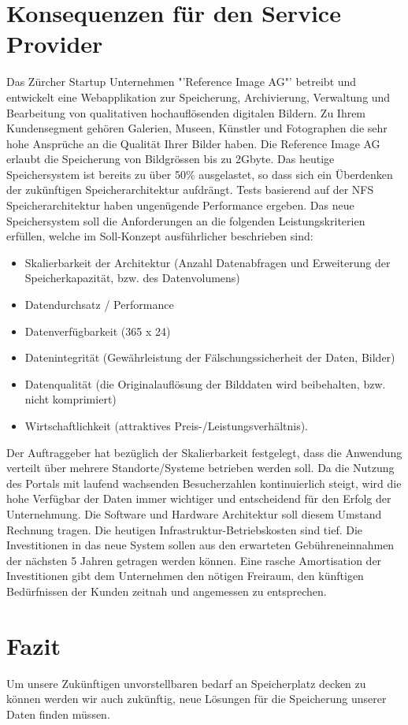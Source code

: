 \section{Konsequenzen für den Service Provider}
Das Zürcher Startup Unternehmen "'Reference Image AG"' betreibt und entwickelt eine Webapplikation zur Speicherung, Archivierung, Verwaltung und Bearbeitung von qualitativen hochauflösenden digitalen Bildern. Zu Ihrem Kundensegment gehören Galerien, Museen, Künstler und Fotographen die sehr hohe Ansprüche an die Qualität Ihrer Bilder haben. Die Reference Image AG erlaubt die Speicherung von Bildgrössen bis zu 2Gbyte. Das heutige Speichersystem ist bereits zu über 50\% ausgelastet, so dass sich ein Überdenken der zukünftigen Speicherarchitektur aufdrängt. Tests basierend auf der NFS Speicherarchitektur haben ungenügende Performance ergeben. Das neue Speichersystem soll die Anforderungen an die folgenden Leistungskriterien erfüllen, welche im Soll-Konzept ausführlicher beschrieben sind: 

\begin{itemize}
\item Skalierbarkeit der Architektur (Anzahl Datenabfragen und Erweiterung der Speicherkapazität, bzw. des Datenvolumens) 
\item Datendurchsatz / Performance 
\item Datenverfügbarkeit (365 x 24) 
\item Datenintegrität (Gewährleistung der Fälschungssicherheit der Daten, Bilder) 
\item Datenqualität (die Originalauflösung der Bilddaten wird beibehalten, bzw. nicht komprimiert) 
\item Wirtschaftlichkeit (attraktives Preis-/Leistungsverhältnis).
\end{itemize}

Der Auftraggeber hat bezüglich der Skalierbarkeit festgelegt, dass die Anwendung verteilt über mehrere Standorte/Systeme betrieben werden soll. Da die Nutzung des Portals mit laufend wachsenden Besucherzahlen kontinuierlich steigt, wird die hohe Verfügbar der Daten immer wichtiger und entscheidend für den Erfolg der Unternehmung. Die Software und Hardware Architektur soll diesem Umstand Rechnung tragen. Die heutigen Infrastruktur-Betriebskosten sind tief. Die Investitionen in das neue System sollen aus den erwarteten Gebühreneinnahmen der nächsten 5 Jahren getragen werden können. Eine rasche Amortisation der Investitionen gibt dem Unternehmen den nötigen Freiraum, den künftigen Bedürfnissen der Kunden zeitnah und angemessen zu entsprechen. 

\section{Fazit}
Um unsere Zukünftigen unvorstellbaren bedarf an Speicherplatz decken zu können werden wir auch zukünftig, neue Lösungen für die Speicherung unserer Daten finden müssen.


